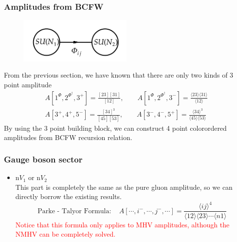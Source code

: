 \documentclass{beamer}
\newcommand{\avg}[1]{\langle #1 \rangle}
\begin{document}
\begin{frame}
    \frametitle{Amplitudes from BCFW}
    \begin{figure}
        \centering
        \includegraphics[width=0.5\textwidth]{2-site.png}
    \end{figure}
    \vspace{-1em}
    From the previous section, we have known that there are only two kinds of 3 point amplitude
    \begin{gather*}
        A[1^\Phi,2^{\Phi^\dagger},3^+]=\frac{[23][31]}{[12]},\qquad A[1^\Phi,2^{\Phi^\dagger},3^-]=\frac{\avg{23}\!\avg{31}}{\avg{12}}\\
        A[3^+,4^+,5^-]=\frac{[34]^3}{[45][53]},\qquad A[3^-,4^-,5^+]=\frac{\avg{34}^3}{\avg{45}\!\avg{53}}
    \end{gather*}
    By using the 3 point building block, we can construct 4 point colorordered amplitudes from BCFW recursion relation.
\end{frame}
\begin{frame}
    \frametitle{Gauge boson sector}
    \begin{itemize}
        \item n$ V_1$ or n$V_2$\\
        This part is completely the same as the pure gluon amplitude, so we can directly borrow the
        existing results.
        \begin{equation*}
            \boxed{\text{Parke - Talyor Formula}:\quad A[\cdots,i^-,\cdots,j^-,\cdots]=\frac{\avg{ij}^4}{\avg{12}\!\avg{23}\cdots\avg{n1}}}
        \end{equation*}
        \textcolor{red}{Notice that this formula only applies to MHV amplitudes, although the NMHV can be completely solved.}
    \end{itemize}
\end{frame}
\end{document}
